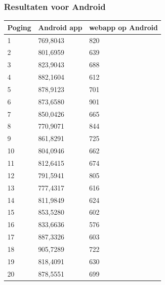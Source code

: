 \documentclass[pdftex,a4paper,12pt,twoside]{report}
\begin{document}
\subsubsection{Resultaten voor Android}
\begin{center}
    \begin{tabular}{ | l | l | l |}
    \hline
    Poging & Android app & webapp op Android
      \\ \hline
      1 & 769,8043 & 820

      \\ \hline
      2 & 801,6959 & 639

      \\ \hline
      3 & 823,9043 & 688

      \\ \hline
      4 & 882,1604 & 612

      \\ \hline
      5 & 878,9123 & 701

      \\ \hline
      6 & 873,6580 & 901

      \\ \hline
      7 & 850,0426 & 665

      \\ \hline
      8 & 770,9071 & 844

      \\ \hline
      9 & 861,8291 & 725

      \\ \hline
      10 & 804,0946 & 662

      \\ \hline
      11 & 812,6415 & 674

      \\ \hline
      12 & 791,5941 & 805

      \\ \hline
      13 & 777,4317 & 616

      \\ \hline
      14 & 811,9849 & 624

      \\ \hline
      15 & 853,5280 & 602

      \\ \hline
      16 & 833,6636 & 576

      \\ \hline
      17 & 887,3326 & 603

      \\ \hline
      18 & 905,7289 & 722

      \\ \hline
      19 & 818,4091 & 630

      \\ \hline
      20 & 878,5551 & 699
    \end{tabular}
\end{center}
\end{document}
